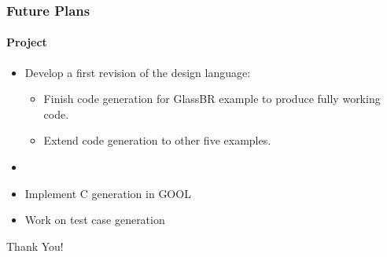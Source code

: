 \documentclass{beamer}
\begin{document}
\begin{frame}

\frametitle{Future Plans}
\framesubtitle{Project}


\begin{itemize}
\item Develop a first revision of the design language:
\begin{itemize}
\item Finish code generation for GlassBR example to produce fully working code.
\item Extend code generation to other five examples.
\end{itemize}
\item[]
\item Implement C generation in GOOL
\item Work on test case generation
\end{itemize}
\end{frame}


\begin{frame}
\begin{center}
\Huge Thank You!
\end{center}
\end{frame}

\end{document}
